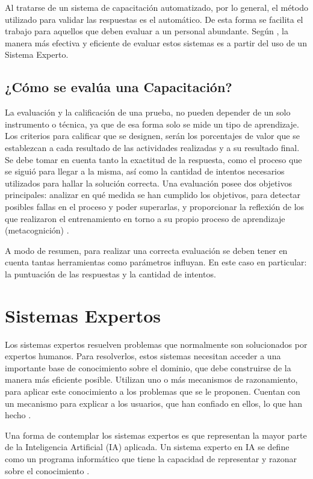 Al tratarse de un sistema de capacitación automatizado, por lo general, el método utilizado para validar las respuestas es el automático. De esta forma se facilita el trabajo para aquellos que deben evaluar a un personal abundante. Según \cite{AltyJL1984}, la manera más efectiva y eficiente de evaluar estos sistemas es a partir del uso de un Sistema Experto.

\subsection{¿Cómo se evalúa una Capacitación?}
La evaluación y la calificación de una prueba, no pueden depender de un solo instrumento o técnica, ya que de esa forma solo se mide un tipo de aprendizaje. Los criterios para calificar que se designen, serán los porcentajes de valor que se establezcan a cada resultado de las actividades realizadas y a su resultado final. Se debe tomar en cuenta tanto la exactitud de la respuesta, como el proceso que se siguió para llegar a la misma, así como la cantidad de intentos necesarios utilizados para hallar la solución correcta.
Una evaluación posee dos objetivos principales: analizar en qué medida se han cumplido los objetivos, para detectar posibles fallas en el proceso y poder superarlas, y proporcionar la reflexión de los que realizaron el entrenamiento en torno a su propio proceso de aprendizaje (metacognición) \cite{RonaldL.Jacobs2012}.

A modo de resumen, para realizar una correcta evaluación se deben tener en cuenta tantas herramientas como parámetros influyan. En este caso en particular: la puntuación de las respuestas y la cantidad de intentos.


\section{Sistemas Expertos}
Los sistemas expertos resuelven problemas que normalmente son solucionados por expertos humanos. Para resolverlos, estos sistemas necesitan acceder a una importante base de conocimiento sobre el dominio, que debe construirse de la manera más eficiente posible.
Utilizan uno o más mecanismos de razonamiento, para aplicar este conocimiento a los problemas que se le proponen. Cuentan con un mecanismo para explicar a los usuarios, que han confiado en ellos, lo que han hecho \cite{AltyJL1984}.

Una forma de contemplar los sistemas expertos es que representan la mayor parte de la Inteligencia Artificial (IA) aplicada. Un sistema experto en IA se define como un programa informático que tiene la capacidad de representar y razonar sobre el conocimiento \cite{Rasheed2021}.
